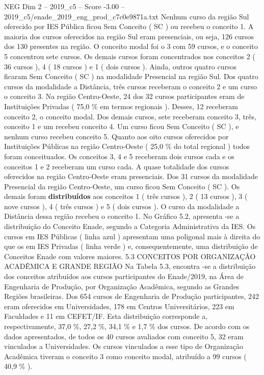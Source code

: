 \begin{textsample}{NEG Dim 2 – 2019\_c5 – Score -3.00 – 2019\_c5/enade\_2019\_eng\_prod\_c7c0e9871a.txt}
Nenhum curso da região Sul oferecido por IES Pública ficou Sem Conceito ( SC ) ou recebeu o conceito 1.
A maioria dos cursos oferecidos na região Sul eram presenciais, ou seja, 126 cursos dos 130 presentes na região.
O conceito modal foi o 3 com 59 cursos, e o conceito 5 concentrou sete cursos.
Os demais cursos foram concentrados nos conceitos 2 ( 36 cursos ), 4 ( 18 cursos ) e 1 ( dois cursos ).
Ainda, outros quatro cursos ficaram Sem Conceito ( SC ) na modalidade Presencial na região Sul.
Dos quatro cursos da modalidade a Distância, três cursos receberam o conceito 2 e um curso o conceito 3.
Na região Centro-Oeste, 24 dos 32 cursos participantes eram de Instituições Privadas ( 75,0 \% em termos regionais ).
Desses, 12 receberam conceito 2, o conceito modal.
Dos demais cursos, sete receberam conceito 3, três, conceito 1 e um recebeu conceito 4.
Um curso ficou Sem Conceito ( SC ), e nenhum curso recebeu conceito 5.
Quanto aos oito cursos oferecidos por Instituições Públicas na região Centro-Oeste ( 25,0 \% do total regional ) todos foram conceituados.
Os conceitos 3, 4 e 5 receberam dois cursos cada e os conceitos 1 e 2 receberam um curso cada.
A quase totalidade dos cursos oferecidos na região Centro-Oeste eram presenciais.
Dos 31 cursos da modalidade Presencial da região Centro-Oeste, um curso ficou Sem Conceito ( SC ).
Os demais foram \textbf{distribuídos} aos conceitos 1 ( três cursos ), 2 ( 13 cursos ), 3 ( nove cursos ), 4 ( três cursos ) e 5 ( dois cursos ).
O curso da modalidade a Distância dessa região recebeu o conceito 1.
No Gráfico 5.2, apresenta -se a distribuição do Conceito Enade, segundo a Categoria Administrativa da IES.
Os cursos em IES Públicas ( linha azul ) apresentam uma poligonal mais à direita do que os em IES Privadas ( linha verde ) e, consequentemente, uma distribuição de Conceitos Enade com valores maiores. 5.3 CONCEITOS POR ORGANIZAÇÃO ACADÊMICA E GRANDE REGIÃO Na Tabela 5.3, encontra -se a distribuição dos conceitos atribuídos aos cursos participantes do Enade/2019, na Área de Engenharia de Produção, por Organização Acadêmica, segundo as Grandes Regiões brasileiras.
Dos 654 cursos de Engenharia de Produção participantes, 242 eram oferecidos em Universidades, 178 em Centros Universitários, 223 em Faculdades e 11 em CEFET/IF.
Esta distribuição corresponde a, respectivamente, 37,0 \%, 27,2 \%, 34,1 \% e 1,7 \% dos cursos.
De acordo com os dados apresentados, de todos os 40 cursos avaliados com conceito 5, 32 eram vinculados a Universidades.
Os cursos vinculados a esse tipo de Organização Acadêmica tiveram o conceito 3 como conceito modal, atribuído a 99 cursos ( 40,9 \% ).

\end{textsample}
